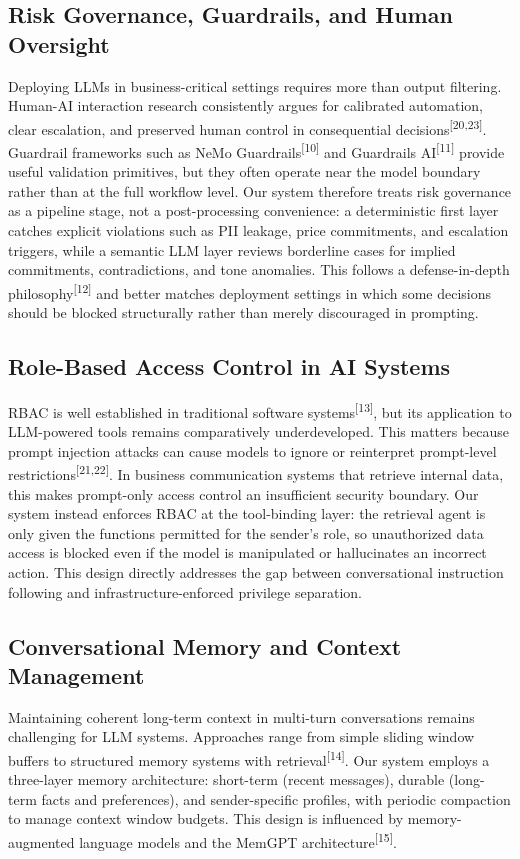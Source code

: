 \documentclass[11pt]{article}
\begin{document}
\subsection{Risk Governance, Guardrails, and Human Oversight}
Deploying LLMs in business-critical settings requires more than output filtering. Human-AI interaction research consistently argues for calibrated automation, clear escalation, and preserved human control in consequential decisions\textsuperscript{[20,23]}. Guardrail frameworks such as NeMo Guardrails\textsuperscript{[10]} and Guardrails AI\textsuperscript{[11]} provide useful validation primitives, but they often operate near the model boundary rather than at the full workflow level. Our system therefore treats risk governance as a pipeline stage, not a post-processing convenience: a deterministic first layer catches explicit violations such as PII leakage, price commitments, and escalation triggers, while a semantic LLM layer reviews borderline cases for implied commitments, contradictions, and tone anomalies. This follows a defense-in-depth philosophy\textsuperscript{[12]} and better matches deployment settings in which some decisions should be blocked structurally rather than merely discouraged in prompting.

\subsection{Role-Based Access Control in AI Systems}
RBAC is well established in traditional software systems\textsuperscript{[13]}, but its application to LLM-powered tools remains comparatively underdeveloped. This matters because prompt injection attacks can cause models to ignore or reinterpret prompt-level restrictions\textsuperscript{[21,22]}. In business communication systems that retrieve internal data, this makes prompt-only access control an insufficient security boundary. Our system instead enforces RBAC at the tool-binding layer: the retrieval agent is only given the functions permitted for the sender's role, so unauthorized data access is blocked even if the model is manipulated or hallucinates an incorrect action. This design directly addresses the gap between conversational instruction following and infrastructure-enforced privilege separation.

\subsection{Conversational Memory and Context Management}
Maintaining coherent long-term context in multi-turn conversations remains challenging for LLM systems. Approaches range from simple sliding window buffers to structured memory systems with retrieval\textsuperscript{[14]}. Our system employs a three-layer memory architecture: short-term (recent messages), durable (long-term facts and preferences), and sender-specific profiles, with periodic compaction to manage context window budgets. This design is influenced by memory-augmented language models and the MemGPT architecture\textsuperscript{[15]}.
\end{document}
